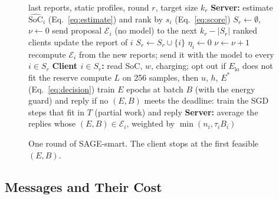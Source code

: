 \begin{figure}[t]
\small
\begin{algorithmic}[1]
\REQUIRE last reports, static profiles, round $r$, target size $k_r$
\STATE \textbf{Server:} estimate $\widehat{\mathrm{SoC}}_i$ (Eq.~\ref{eq:estimate}) and rank by $s_i$ (Eq.~\ref{eq:score})
\STATE $S_r \gets \emptyset$, $\nu \gets 0$
  \STATE send proposal $\mathcal{E}_i$ (no model) to the next $k_r-|S_r|$ ranked clients
    \STATE update the report of $i$
     \STATE $S_r \gets S_r\cup\{i\}$ \ELSE \STATE $\eta_i \gets 0$ \ENDIF
  \ENDFOR
  \STATE $\nu \gets \nu+1$
\ENDWHILE
\STATE recompute $\mathcal{E}_i$ from the new reports; send it with the model to every $i\in S_r$
\STATE \textbf{Client $i\in S_r$:} read SoC, $w$, charging; opt out if $E_{\mathrm{lo}}$ does not fit the reserve
\STATE compute $L$ on 256 samples, then $u$, $h$, $E^\ast$ (Eq.~\ref{eq:decision})
      \STATE train $E$ epochs at batch $B$ (with the energy guard) and reply
    \ENDIF
  \ENDFOR
\ENDFOR
\STATE if no $(E,B)$ meets the deadline: train the SGD steps that fit in $T$ (partial work) and reply
\STATE \textbf{Server:} average the replies whose $(E,B)\in\mathcal{E}_i$, weighted by $\min(n_i,\tau_i B_i)$
\end{algorithmic}
\caption{One round of SAGE-smart. The client stops at the first feasible
$(E,B)$.}
\label{alg:smart}
\end{figure}

\subsection{Messages and Their Cost}\label{sec:protocols}

